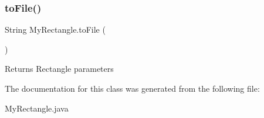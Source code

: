 \subsubsection{\texorpdfstring{to\+File()}{toFile()}}
{\footnotesize\ttfamily String My\+Rectangle.\+to\+File (\begin{DoxyParamCaption}{ }\end{DoxyParamCaption})\hspace{0.3cm}{\ttfamily [inline]}}

\begin{DoxyReturn}{Returns}
Rectangle parameters 
\end{DoxyReturn}


The documentation for this class was generated from the following file\+:\begin{DoxyCompactItemize}
\item 
My\+Rectangle.\+java\end{DoxyCompactItemize}
